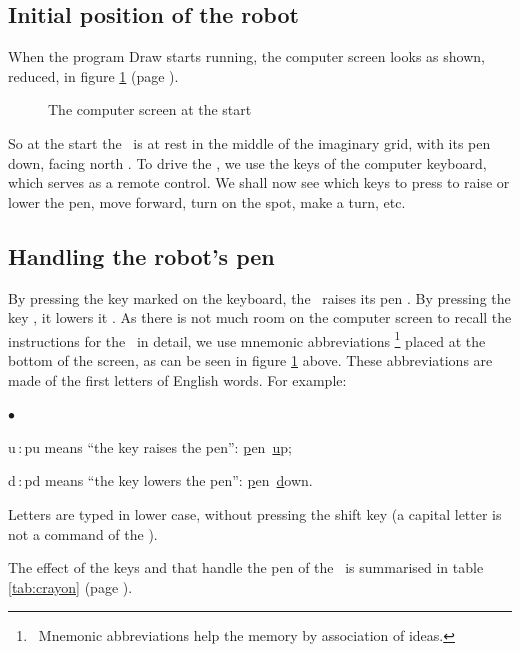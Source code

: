 \subsection{Initial position of the robot}

When the program {\idt Draw}
starts running, the computer
screen looks as shown, reduced, in figure
\ref{fig:ecran-initial-1}  (page \pageref{fig:ecran-initial-1}).
\begin{figure}[htbp]
 \caption{The computer screen at the start}
 \label{fig:ecran-initial-1}
\end{figure}
So at the start the \robot\ is at rest in the middle of the imaginary
grid, with its pen down, facing north \robotCbN\/.
To drive the \robot, we use the keys of the computer keyboard,
which serves as a remote control. We shall now
see which keys to press to raise or lower the pen,
move forward, turn on the spot, make a turn, etc.

\subsection{Handling the robot's pen}

 By pressing the key marked  on the
keyboard, the \robot\ raises its pen \robotClN\/. By pressing the key
, it lowers it \robotCbN\/. As there is not much room on the computer
screen to
recall the instructions for the \robot\ in detail, we use
mnemonic abbreviations%
%
\footnote{\ Mnemonic abbreviations help the memory by association of ideas.}
placed at the bottom of the screen, as can be
seen in figure
\ref{fig:ecran-initial-1} above.
These abbreviations are made of the first letters of English words.
For \hbox{example:}
\begin{list}{$\scriptscriptstyle\bullet$}{
}
\item {\idt u}\,$:${\idt pu} means ``the key  raises the pen'':
\hbox{\underline{p}en \underline{u}p;}
\item {\idt d}\,$:${\idt pd} means ``the key  lowers the pen'':
\hbox{\underline{p}en \underline{d}own.}
\end{list}
Letters are typed in lower case, without pressing the shift key
(a capital letter is not a command of the \robot).

The effect of the keys  and  that handle the pen of the
\robot\ is summarised in table \ref{tab:crayon} (page \pageref{tab:crayon}).

